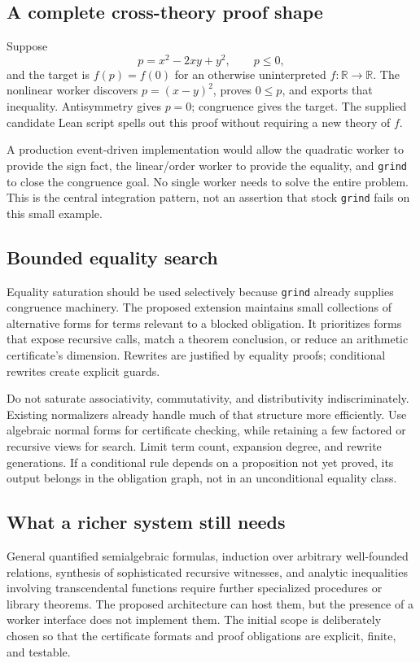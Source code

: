 \documentclass[11pt,a4paper]{article}
\theoremstyle{definition}
\newcommand{\grind}{\texttt{grind}}
\newcommand{\R}{\mathbb{R}}
\begin{document}
\subsection{A complete cross-theory proof shape}

Suppose
\[
 p=x^2-2xy+y^2,\qquad p\le0,
\]
and the target is $f(p)=f(0)$ for an otherwise uninterpreted $f:\R\to\R$. The nonlinear worker discovers $p=(x-y)^2$, proves $0\le p$, and exports that inequality. Antisymmetry gives $p=0$; congruence gives the target. The supplied candidate Lean script spells out this proof without requiring a new theory of $f$.

A production event-driven implementation would allow the quadratic worker to provide the sign fact, the linear/order worker to provide the equality, and \grind{} to close the congruence goal. No single worker needs to solve the entire problem. This is the central integration pattern, not an assertion that stock \grind{} fails on this small example.

\subsection{Bounded equality search}

Equality saturation should be used selectively because \grind{} already supplies congruence machinery. The proposed extension maintains small collections of alternative forms for terms relevant to a blocked obligation. It prioritizes forms that expose recursive calls, match a theorem conclusion, or reduce an arithmetic certificate's dimension. Rewrites are justified by equality proofs; conditional rewrites create explicit guards.

Do not saturate associativity, commutativity, and distributivity indiscriminately. Existing normalizers already handle much of that structure more efficiently. Use algebraic normal forms for certificate checking, while retaining a few factored or recursive views for search. Limit term count, expansion degree, and rewrite generations. If a conditional rule depends on a proposition not yet proved, its output belongs in the obligation graph, not in an unconditional equality class.

\subsection{What a richer system still needs}

General quantified semialgebraic formulas, induction over arbitrary well-founded relations, synthesis of sophisticated recursive witnesses, and analytic inequalities involving transcendental functions require further specialized procedures or library theorems. The proposed architecture can host them, but the presence of a worker interface does not implement them. The initial scope is deliberately chosen so that the certificate formats and proof obligations are explicit, finite, and testable.
\end{document}
